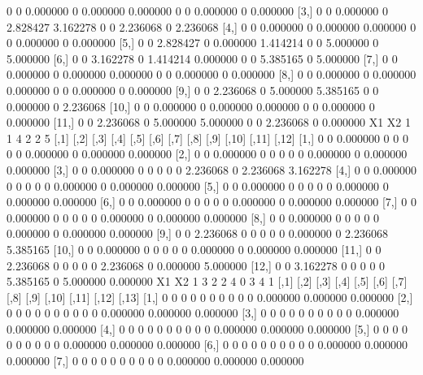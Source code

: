 \documentclass[a4paper]{article}
\begin{document}
\begin{Schunk}
\begin{Soutput}
 [2,]    0    0 0.000000    0 0.000000 0.000000    0    0 0.000000     0 0.000000
 [3,]    0    0 0.000000    0 2.828427 3.162278    0    0 2.236068     0 2.236068
 [4,]    0    0 0.000000    0 0.000000 0.000000    0    0 0.000000     0 0.000000
 [5,]    0    0 2.828427    0 0.000000 1.414214    0    0 5.000000     0 5.000000
 [6,]    0    0 3.162278    0 1.414214 0.000000    0    0 5.385165     0 5.000000
 [7,]    0    0 0.000000    0 0.000000 0.000000    0    0 0.000000     0 0.000000
 [8,]    0    0 0.000000    0 0.000000 0.000000    0    0 0.000000     0 0.000000
 [9,]    0    0 2.236068    0 5.000000 5.385165    0    0 0.000000     0 2.236068
[10,]    0    0 0.000000    0 0.000000 0.000000    0    0 0.000000     0 0.000000
[11,]    0    0 2.236068    0 5.000000 5.000000    0    0 2.236068     0 0.000000
  X1 X2
1  1  4
2  2  5
      [,1] [,2]     [,3] [,4] [,5] [,6] [,7] [,8]     [,9] [,10]    [,11]    [,12]
 [1,]    0    0 0.000000    0    0    0    0    0 0.000000     0 0.000000 0.000000
 [2,]    0    0 0.000000    0    0    0    0    0 0.000000     0 0.000000 0.000000
 [3,]    0    0 0.000000    0    0    0    0    0 2.236068     0 2.236068 3.162278
 [4,]    0    0 0.000000    0    0    0    0    0 0.000000     0 0.000000 0.000000
 [5,]    0    0 0.000000    0    0    0    0    0 0.000000     0 0.000000 0.000000
 [6,]    0    0 0.000000    0    0    0    0    0 0.000000     0 0.000000 0.000000
 [7,]    0    0 0.000000    0    0    0    0    0 0.000000     0 0.000000 0.000000
 [8,]    0    0 0.000000    0    0    0    0    0 0.000000     0 0.000000 0.000000
 [9,]    0    0 2.236068    0    0    0    0    0 0.000000     0 2.236068 5.385165
[10,]    0    0 0.000000    0    0    0    0    0 0.000000     0 0.000000 0.000000
[11,]    0    0 2.236068    0    0    0    0    0 2.236068     0 0.000000 5.000000
[12,]    0    0 3.162278    0    0    0    0    0 5.385165     0 5.000000 0.000000
  X1 X2
1  3  2
2  4  0
3  4  1
      [,1] [,2] [,3] [,4] [,5] [,6] [,7] [,8] [,9] [,10]    [,11]    [,12]    [,13]
 [1,]    0    0    0    0    0    0    0    0    0     0 0.000000 0.000000 0.000000
 [2,]    0    0    0    0    0    0    0    0    0     0 0.000000 0.000000 0.000000
 [3,]    0    0    0    0    0    0    0    0    0     0 0.000000 0.000000 0.000000
 [4,]    0    0    0    0    0    0    0    0    0     0 0.000000 0.000000 0.000000
 [5,]    0    0    0    0    0    0    0    0    0     0 0.000000 0.000000 0.000000
 [6,]    0    0    0    0    0    0    0    0    0     0 0.000000 0.000000 0.000000
 [7,]    0    0    0    0    0    0    0    0    0     0 0.000000 0.000000 0.000000

\end{Soutput}
\end{Schunk}
\end{document}
